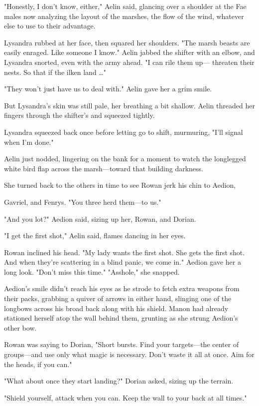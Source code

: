 "Honestly, I don't know, either," Aelin said, glancing over a shoulder at the Fae males now analyzing the layout of the marshes, the flow of the wind, whatever else to use to their advantage.

Lysandra rubbed at her face, then squared her shoulders.
"The marsh beasts are easily enraged.
Like someone I know."
Aelin jabbed the shifter with an elbow, and Lysandra snorted, even with the army ahead.
"I can rile them up--- threaten their nests.
So that if the ilken land \ldots"

"They won't just have us to deal with."
Aelin gave her a grim smile.

But Lysandra's skin was still pale, her breathing a bit shallow.
Aelin threaded her fingers through the shifter's and squeezed tightly.

Lysandra squeezed back once before letting go to shift, murmuring, "I'll signal when I'm done."

Aelin just nodded, lingering on the bank for a moment to watch the longlegged white bird flap across the marsh---toward that building darkness.

She turned back to the others in time to see Rowan jerk his chin to Aedion,

Gavriel, and Fenrys.
"You three herd them---to us."

"And you lot?"
Aedion said, sizing up her, Rowan, and Dorian.

"I get the first shot," Aelin said, flames dancing in her eyes.

Rowan inclined his head.
"My lady wants the first shot.
She gets the first shot.
And when they're scattering in a blind panic, we come in."
Aedion gave her a long look.
"Don't miss this time."
"Asshole," she snapped.

Aedion's smile didn't reach his eyes as he strode to fetch extra weapons from their packs, grabbing a quiver of arrows in either hand, slinging one of the longbows across his broad back along with his shield.
Manon had already stationed herself atop the wall behind them, grunting as she strung Aedion's other bow.

Rowan was saying to Dorian, "Short bursts.
Find your targets---the center of groups---and use only what magic is necessary.
Don't waste it all at once.
Aim for the heads, if you can."

"What about once they start landing?"
Dorian asked, sizing up the terrain.

"Shield yourself, attack when you can.
Keep the wall to your back at all times."

